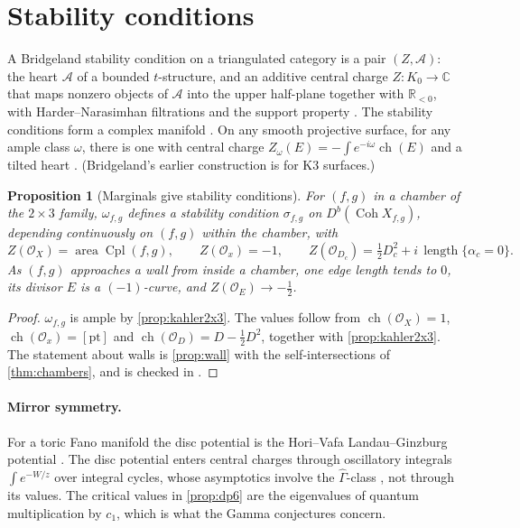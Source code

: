 \documentclass[11pt]{article}
\newtheorem{proposition}[theorem]{Proposition}
\theoremstyle{definition}
\theoremstyle{remark}
\newcommand{\Cpl}{\operatorname{Cpl}}
\newcommand{\ch}{\operatorname{ch}}
\newcommand{\Coh}{\operatorname{Coh}}
\begin{document}
\section{Stability conditions}\label{sec:stability}

A Bridgeland stability condition on a triangulated category is a pair $(Z,\mathcal A)$: the heart $\mathcal A$
of a bounded $t$-structure, and an additive central charge $Z\colon K_0\to\mathbb{C}$ that maps nonzero objects of
$\mathcal A$ into the upper half-plane together with $\mathbb{R}_{<0}$, with Harder--Narasimhan filtrations and the
support property \cite{Bridgeland2007}. The stability conditions form a complex manifold
\cite{Bridgeland2007}. On any smooth projective surface, for any ample class $\omega$, there is one with
central charge $Z_\omega(E)=-\int e^{-i\omega}\ch(E)$ and a tilted heart \cite{ArcaraBertram2013,MacriSchmidt2017}.
(Bridgeland's earlier construction \cite{Bridgeland2008} is for K3 surfaces.)

\begin{proposition}[Marginals give stability conditions]\label{prop:stab}
For $(f,g)$ in a chamber of the $2\times3$ family, $\omega_{f,g}$ defines a stability condition $\sigma_{f,g}$ on
$D^b(\Coh X_{f,g})$, depending continuously on $(f,g)$ within the chamber, with
\[
Z(\mathcal O_X)=\operatorname{area}\Cpl(f,g),\qquad Z(\mathcal O_x)=-1,\qquad
Z(\mathcal O_{D_c})=\tfrac12D_c^2+i\,\operatorname{length}\{\alpha_c=0\}.
\]
As $(f,g)$ approaches a wall from inside a chamber, one edge length tends to $0$, its divisor $E$ is a
$(-1)$-curve, and $Z(\mathcal O_E)\to-\tfrac12$.
\end{proposition}
\begin{proof}
$\omega_{f,g}$ is ample by \cref{prop:kahler2x3}. The values follow from $\ch(\mathcal O_X)=1$,
$\ch(\mathcal O_x)=[\mathrm{pt}]$ and $\ch(\mathcal O_D)=D-\tfrac12D^2$, together with \cref{prop:kahler2x3}. The
statement about walls is \cref{prop:wall} with the self-intersections of \cref{thm:chambers}, and is
checked in \cite[\S8]{Conditionals}.
\end{proof}

\paragraph{Mirror symmetry.} For a toric Fano manifold the disc potential is the Hori--Vafa
Landau--Ginzburg potential \cite{ChoOh2006}. The disc potential enters central charges through oscillatory
integrals $\int e^{-W/z}$ over integral cycles, whose asymptotics involve the $\widehat\Gamma$-class
\cite{Iritani2009,GGI2016}, not through its values. The critical values in \cref{prop:dp6} are the
eigenvalues of quantum multiplication by $c_1$, which is what the Gamma conjectures concern.
\end{document}

